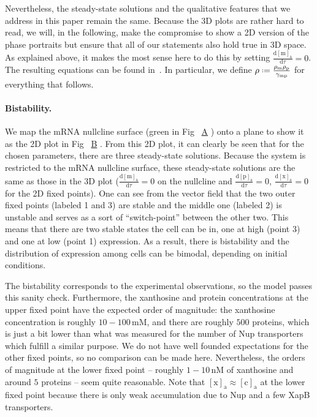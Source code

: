 \documentclass[10pt,letterpaper]{article}
\newcommand{\unit}[1]{\,\mathrm{#1}}
\newcommand{\n}[1]{\mathrm{#1}}
\newcommand{\dd}[2]{\frac{\mathrm{d} #1}{\mathrm{d} #2}}
\newcommand*{\defeq}{\mathrel{\vcenter{\baselineskip0.5ex \lineskiplimit0pt
			\hbox{\scriptsize.}\hbox{\scriptsize.}}}%
	=}
\newcommand\subref[2]{%
	\def\myref{\getrefnumber{#1}}%
	\hyperref[#1]{\myref\mbox{#2}}%
}
\begin{document}
	Nevertheless, the steady-state solutions and the qualitative features that
	we address in this paper remain the same. Because the 3D plots are rather
	hard to read, we will, in the following, make the compromise to show a 2D
	version of the phase portraits but ensure that all of our statements also
	hold true in 3D space. As explained above, it makes the most sense here to
	do this by setting $\dd{\n{[m]_a}}{\tau}=0$. The resulting equations can be
	found in~. In particular, we define $\rho \defeq
	\frac{\rho_{\n{m}} \rho_{\n{p}}}{\gamma_{\n{mp}}}$ for everything that
	follows.
	
	\paragraph*{Bistability.} 
	We map the mRNA nullcline surface (green in Fig~\subref{fig4:bistability}{A}) onto a plane to show it as the 2D plot in Fig~\subref{fig4:bistability}{B}.
	From this 2D plot, it can clearly be seen
	that for the chosen parameters, there are three steady-state solutions.
	Because the system is restricted to the mRNA nullcline surface, these steady-state solutions are the same as those in the 3D plot
	($\dd{\n{[m]_a}}{\tau}=0$ on the nullcline and $\dd{\n{[p]_a}}{\tau}=0$,
	$\dd{\n{[x]_a}}{\tau}=0$ for the 2D fixed points). One can see from the
	vector field that the two outer fixed points (labeled 1 and 3) are stable and the
	middle one (labeled 2) is unstable and serves as a sort of ``switch-point''
	between the other two. This means that there are two stable states the cell
	can be in, one at high (point 3) and one at low (point 1) expression. As a
	result, there is bistability and the distribution of expression among cells
	can be bimodal, depending on initial conditions.
	
	The bistability corresponds to the experimental observations\cite{Chure2019}, so the model passes this
	sanity check. Furthermore, the xanthosine and protein concentrations at the
	upper fixed point have the expected order of magnitude: the xanthosine
	concentration is roughly $10-100 \unit{mM}$, and there are roughly $500$
	proteins, which is just a bit lower than what was measured for the number of
	Nup transporters~\cite{Li2014} which fulfill a similar purpose. We do not
	have well founded expectations for the other fixed points, so no comparison
	can be made here. Nevertheless, the orders of magnitude at the lower fixed
	point -- roughly $1-10 \unit{nM}$ of xanthosine and around $5$ proteins --
	seem quite reasonable. Note that $\n{[x]_a} \approx \n{[c]_a}$ at the
	lower fixed point because there is only weak accumulation due to Nup and a
	few XapB transporters.
	
\end{document}
